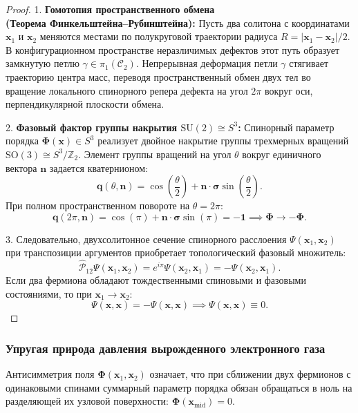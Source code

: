 \documentclass[12pt,a4paper]{article}
\begin{document}
	\begin{proof}
		1. \textbf{Гомотопия пространственного обмена\\ (Теорема Финкельштейна--Рубинштейна):}
		Пусть два солитона с координатами $\mathbf{x}_1$ и $\mathbf{x}_2$ меняются местами по полукруговой траектории радиуса $R = |\mathbf{x}_1 - \mathbf{x}_2| / 2$. В конфигурационном пространстве неразличимых дефектов этот путь образует замкнутую петлю $\gamma \in \pi_1(\mathcal{C}_2)$. 
		Непрерывная деформация петли $\gamma$ стягивает траекторию центра масс, переводя пространственный обмен двух тел во вращение локального спинорного репера дефекта на угол $2\pi$ вокруг оси, перпендикулярной плоскости обмена.
		
		2. \textbf{Фазовый фактор группы накрытия $\mathrm{SU}(2) \cong S^3$:}
		Спинорный параметр порядка $\boldsymbol{\Phi}(\mathbf{x}) \in S^3$ реализует двойное накрытие группы трехмерных вращений $\mathrm{SO}(3) \cong S^3 / \mathbb{Z}_2$. Элемент группы вращений на угол $\theta$ вокруг единичного вектора $\mathbf{n}$ задается кватернионом:
		\begin{equation}
			\mathbf{q}(\theta, \mathbf{n}) = \cos\left(\frac{\theta}{2}\right) + \mathbf{n} \cdot \boldsymbol{\sigma} \sin\left(\frac{\theta}{2}\right).
		\end{equation}
		При полном пространственном повороте на $\theta = 2\pi$:
		\begin{equation}
			\mathbf{q}(2\pi, \mathbf{n}) = \cos(\pi) + \mathbf{n} \cdot \boldsymbol{\sigma} \sin(\pi) = \mathbf{-1} \implies \boldsymbol{\Phi} \to -\boldsymbol{\Phi}.
		\end{equation}
		
		3. Следовательно, двухсолитонное сечение спинорного расслоения $\Psi(\mathbf{x}_1, \mathbf{x}_2)$ при транспозиции аргументов приобретает топологический фазовый множитель:
		\begin{equation}
			\hat{\mathcal{P}}_{12} \Psi(\mathbf{x}_1, \mathbf{x}_2) = e^{i \pi} \Psi(\mathbf{x}_2, \mathbf{x}_1) = -\Psi(\mathbf{x}_2, \mathbf{x}_1).
		\end{equation}
		Если два фермиона обладают тождественными спиновыми и фазовыми состояниями, то при $\mathbf{x}_1 \to \mathbf{x}_2$:
		\begin{equation}
			\Psi(\mathbf{x}, \mathbf{x}) = -\Psi(\mathbf{x}, \mathbf{x}) \implies \Psi(\mathbf{x}, \mathbf{x}) \equiv 0.
		\end{equation}
	\end{proof}
	
	\subsubsection{Упругая природа давления вырожденного электронного газа}
	Антисимметрия поля $\boldsymbol{\Phi}(\mathbf{x}_1, \mathbf{x}_2)$ означает, что при сближении двух фермионов с одинаковыми спинами суммарный параметр порядка обязан обращаться в ноль на разделяющей их узловой поверхности: $\boldsymbol{\Phi}(\mathbf{x}_{\text{mid}}) = 0$.
	
\end{document}
